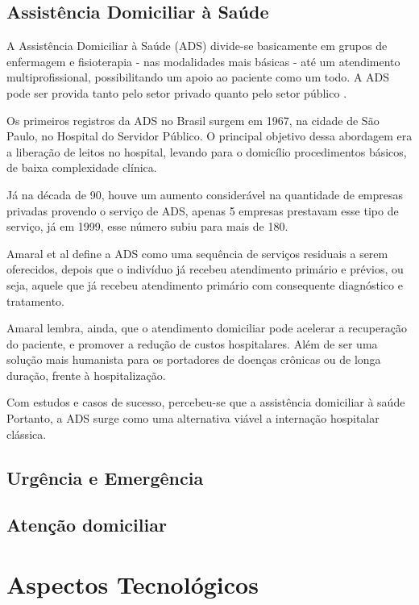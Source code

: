\subsection{Assistência Domiciliar à Saúde}\label{subsec:atencao-domiciliar}

A Assistência Domiciliar à Saúde (ADS) divide-se basicamente em grupos de
enfermagem e fisioterapia - nas modalidades mais básicas - até um atendimento
multiprofissional, possibilitando um apoio ao paciente como um todo. A ADS
pode ser provida tanto pelo setor privado quanto pelo setor público \cite{amaral2001assistencia}.

Os primeiros registros da ADS no Brasil surgem em 1967, na cidade de São
Paulo, no Hospital do Servidor Público. O principal objetivo dessa abordagem
era a liberação de leitos no hospital, levando para o domicílio procedimentos
básicos, de baixa complexidade clínica.

Já na década de 90, houve um aumento considerável na quantidade de empresas
privadas provendo o serviço de ADS, apenas 5 empresas prestavam esse tipo de 
serviço, já em 1999, esse número subiu para mais de 180.

Amaral et al define a ADS como uma sequência de serviços residuais a serem
oferecidos, depois que o indivíduo já recebeu atendimento primário e prévios,
ou seja, aquele que já recebeu atendimento primário com consequente diagnóstico
e tratamento.

Amaral lembra, ainda, que o atendimento domiciliar pode acelerar a recuperação do 
paciente, e promover a redução de custos hospitalares. Além de ser uma solução mais 
humanista para os portadores de doenças crônicas ou de longa duração, frente à 
hospitalização.

Com estudos e casos de sucesso, percebeu-se que a assistência domiciliar à saúde  Portanto, a ADS
surge como uma alternativa viável a internação hospitalar clássica.



\subsection{Urgência e Emergência}\label{subsec:urgencia-emergencia}
\lipsum[1]

\subsection{Atenção domiciliar}\label{subsec:atencao-domiciliar}

\lipsum[1]

\section{Aspectos Tecnológicos}\label{sec:aspectos-tecnologicos}
